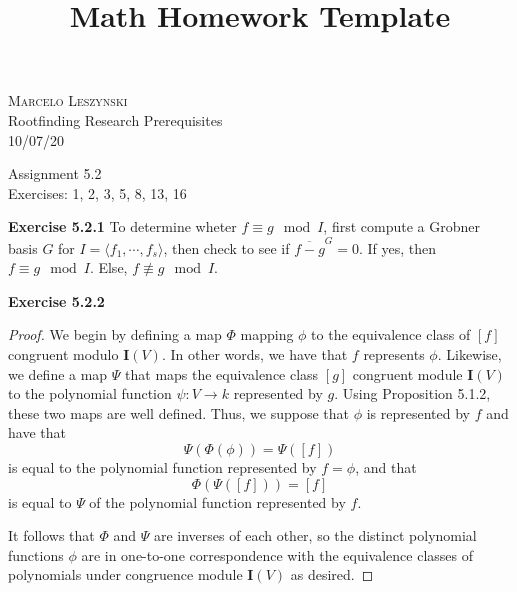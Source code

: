 \documentclass[12pt,oneside]{article}
\newenvironment{exercise}[1]{\vspace{.1in}\noindent\textbf{Exercise #1 \hspace{.05em}}}{}
\begin{document}
\title{Math Homework Template}

\begin{flushright}
\textsc{Marcelo Leszynski}  \\
Rootfinding Research Prerequisites\\
10/07/20
\end{flushright}

\begin{center}
\textsf{Assignment 5.2 } \\
\textsf{Exercises: 1, 2, 3, 5, 8, 13, 16 }
\end{center}


\begin{exercise}{5.2.1}
    To determine wheter $f \equiv g \mod{I}$, first compute 
    a Grobner basis $G$ for $I = \langle f_1,\cdots,f_s\rangle$, 
    then check to see if $\overline{f-g}^G = 0$. If yes, then 
    $f\equiv g \mod{I}$. Else, $f \not \equiv g \mod{I}$.
\end{exercise}


\begin{exercise}{5.2.2}
    \begin{proof}
        We begin by defining a map $\Phi$ mapping $\phi$ to the 
        equivalence class of $[f]$ congruent modulo $\mathbf{I}(V)$.
        In other words, we have that $f$ represents $\phi$. Likewise,
        we define a map $\Psi$ that maps the equivalence class $[g]$ 
        congruent module $\mathbf{I}(V)$ to the polynomial function 
        $\psi: V \to k$ represented by $g$. Using Proposition 5.1.2, 
        these two maps are well defined. Thus, we suppose that $\phi$ 
        is represented by $f$ and have that 
        \[
            \Psi(\Phi(\phi)) = \Psi([f])   
        \]
        is equal to the polynomial function represented by $f = \phi$,
        and that
        \[
            \Phi(\Psi([f])) = [f]    
        \]
        is equal to $\Psi$ of the polynomial function represented by $f$.

        It follows that $\Phi$ and $\Psi$ are inverses of each other, 
        so the distinct polynomial functions $\phi$ are in one-to-one
        correspondence with the equivalence classes of polynomials 
        under congruence module $\mathbf{I}(V)$ as desired.
    \end{proof}
\end{exercise}
\end{document}
